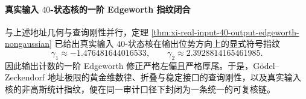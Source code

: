 \paragraph{真实输入 \texorpdfstring{$40$}{40}-状态核的一阶 Edgeworth 指纹闭合}
与上述地址几何与查询刚性并行，定理 \ref{thm:xi-real-input-40-output-edgeworth-nongaussian} 已给出真实输入 \(40\)-状态核在输出位势方向上的显式符号指纹
\[
\gamma_1\approx -1.476481644016533,
\qquad
\gamma_2\approx 2.3928814165461985.
\]
因此输出计数的一阶 Edgeworth 修正严格左偏且严格厚尾。于是，Gödel--Zeckendorf 地址极限的黄金维数律、折叠与稳定接口的查询刚性，以及真实输入核的非高斯统计指纹，便在同一审计口径下封闭为一条统一的可复核链。

\endinput
